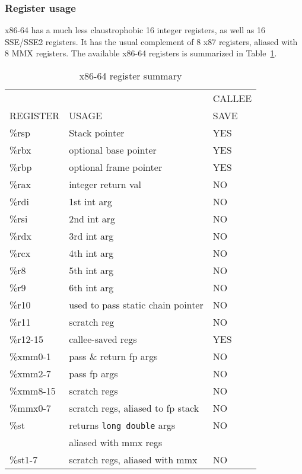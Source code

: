 \documentclass[11pt]{article}
\begin{document}
\subsubsection{Register usage}
x86-64 has a much less claustrophobic 16 integer registers, as well
as 16 SSE/SSE2 registers.  It has the usual complement of 8 x87 registers,
aliased with 8 MMX registers.  The available x86-64 registers is summarized
in Table~\ref{tab-x86-64-regs}.
\begin{table}[hbt]
\begin{center}
\begin{tabular}{||l|l|l||}\hline\hline
         &       & CALLEE\\
REGISTER & USAGE & SAVE\\\hline\hline
\%rsp    & Stack pointer         & YES\\\hline
\%rbx    & optional base pointer & YES\\\hline
\%rbp    & optional frame pointer& YES\\\hline
\%rax    & integer return val & NO\\\hline
\%rdi    & 1st int arg  & NO\\\hline
\%rsi    & 2nd int arg  & NO\\\hline
\%rdx    & 3rd int arg  & NO\\\hline
\%rcx    & 4th int arg  & NO\\\hline
\%r8     & 5th int arg  & NO\\\hline
\%r9     & 6th int arg  & NO\\\hline
\%r10    & used to pass static chain pointer & NO\\\hline
\%r11    & scratch reg  & NO\\\hline
\%r12-15 & callee-saved regs & YES \\\hline\hline
\%xmm0-1  & pass \& return fp args & NO \\\hline
\%xmm2-7  & pass fp args & NO \\\hline
\%xmm8-15 & scratch regs & NO\\\hline\hline
\%mmx0-7   & scratch regs, aliased to fp stack & NO\\\hline\hline
\%st      & returns {\tt long double} args & NO\\
          & aliased with mmx regs          & \\\hline
\%st1-7   & scratch regs, aliased with mmx & NO\\\hline\hline
\end{tabular}
\end{center}
\caption{x86-64 register summary\label{tab-x86-64-regs}}
\end{table}
\end{document}
